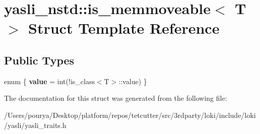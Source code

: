 \hypertarget{structyasli__nstd_1_1is__memmoveable}{}\section{yasli\+\_\+nstd\+:\+:is\+\_\+memmoveable$<$ T $>$ Struct Template Reference}
\label{structyasli__nstd_1_1is__memmoveable}
\subsection*{Public Types}
\begin{DoxyCompactItemize}
\item 
\hypertarget{structyasli__nstd_1_1is__memmoveable_a33fd8b4be85551c9353b3c582d72977d}{}enum \{ {\bfseries value} = int(!is\+\_\+class$<$T$>$\+:\+:value)
 \}\label{structyasli__nstd_1_1is__memmoveable_a33fd8b4be85551c9353b3c582d72977d}

\end{DoxyCompactItemize}


The documentation for this struct was generated from the following file\+:\begin{DoxyCompactItemize}
\item 
/\+Users/pourya/\+Desktop/platform/repos/tetcutter/src/3rdparty/loki/include/loki/yasli/yasli\+\_\+traits.\+h\end{DoxyCompactItemize}
